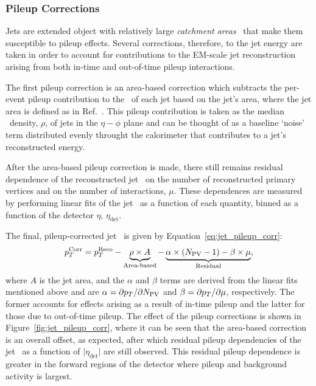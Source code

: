 \subsubsection{Pileup Corrections}
\label{sec:jet_pileup_correction}

Jets are extended object with relatively large \textit{catchment areas}~\cite{Cacciari:2008gn} that make them susceptible to
pileup effects.
Several corrections, therefore, to the jet energy are taken in order to account for contributions to the EM-scale jet reconstruction
arising from both in-time and out-of-time pileup interactions.

The first pileup correction is an area-based correction which subtracts the per-event pileup contribution to the
\pT~of each jet based on the jet's area, where the jet area is defined as in Ref.~\cite{Cacciari:2008gn}.
This pileup contribution is taken as the median \pT~density, $\rho$, of jets in the $\eta-\phi$ plane and
can be thought of as a baseline `noise' term distributed evenly throught the calorimeter that contributes to a jet's reconstructed energy.

After the area-based pileup correction is made, there still remains residual dependence of the reconstructed jet \pT~on the
number of reconstructed primary vertices and on the number of interactions, $\mu$.
These dependences are measured by performing linear fits of the jet \pT~as a function of each quantity, binned as a function of the detector $\eta$, $\eta_{\text{det}}$.

The final, pileup-corrected jet \pT~is given by Equation~\ref{eq:jet_pileup_corr}:
\begin{align}
    p_{T}^{\text{Corr}} = p_{T}^{\text{Reco}} - \underbrace{\rho \times A}_{\text{Area-based}} - \underbrace{\alpha \times (N_{\text{PV}} - 1) - \beta \times \mu}_{\text{Residual}},
    \label{eq:jet_pileup_corr}
\end{align}
where $A$ is the jet area, and the $\alpha$ and $\beta$ terms are derived from the linear fits mentioned above and are $\alpha = \partial p_{T} / \partial N_{\text{PV}}$
and $\beta = \partial p_{T} / \partial \mu$, respectively.
The former accounts for effects arising as a result of in-time pileup and the latter for those due to out-of-time pileup.
The effect of the pileup corrections is shown in Figure~\ref{fig:jet_pileup_corr}, where it can be seen that the area-based correction
is an overall offset, as expected, after which residual pileup dependencies of the jet \pT~as a function of $\lvert \eta_{\text{det}} \rvert$ are still observed.
This residual pileup dependence is greater in the forward regions of the detector where pileup and background activity is largest.

